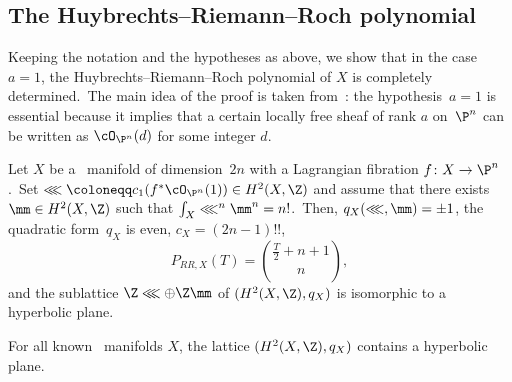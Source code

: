 \subsection{The Huybrechts--Riemann--Roch polynomial}\label{subsec:RRpolynomialLagrangian}

Keeping the notation and the hypotheses as above, we show that in the case $a=1$, the Huybrechts--Riemann--Roch polynomial of $X$ is completely determined.\
The main idea of the proof is taken from~\cite{ort}: the hypothesis~$a=1$ is essential because it implies that a certain locally free sheaf of rank $a$ on~$\P^n$ can be written as $\cO_{\P^n}(d)$ for some integer $d$.

\begin{theo}\label{th21}
Let $X$ be a \hk\ manifold of dimension~$2n$ with a Lagrangian fibration $f\colon X\to \P^n$.\
Set $\lll\coloneqq c_1(f^*\cO_{\P^n}(1))\in H^2(X,\Z)$ and assume that there exists $\mm\in H^2(X,\Z)$ such that $\int_X \lll^{n}\mm^{n}=n!$.\
Then, $q_X(\lll,\mm)=\pm 1$, the quadratic form~$q_X$ is even, $c_X=(2n-1)!!$,
\begin{equation*}
P_{RR,X}(T)= \binom{\frac{T}{2}+n+1}{n},
\end{equation*}
and the sublattice $\Z\lll\oplus \Z\mm$ of $(H^2(X,\Z),q_X)$ is isomorphic to a hyperbolic plane.
\end{theo}

For all known \hk\ manifolds $X$, the lattice $(H^2(X,\Z),q_X)$ contains a hyperbolic plane.

